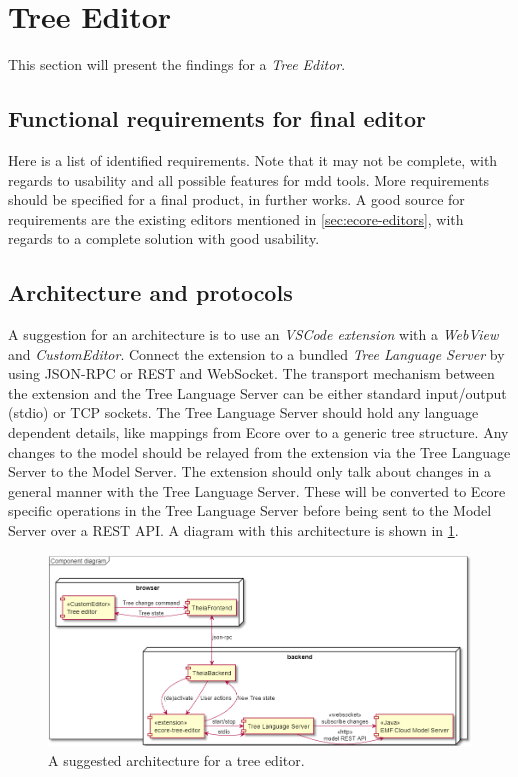 \section{Tree Editor}\label{sec:result-tree-editor}

This section will present the findings for a \emph{Tree Editor}.

\subsection{Functional requirements for final editor}

Here is a list of identified requirements.
Note that it may not be complete, with regards to usability and all possible features for \gls{mdd} tools.
More requirements should be specified for a final product, in further works.
A good source for requirements are the existing editors mentioned in \cref{sec:ecore-editors}, with regards to a complete solution with good usability.



\subsection{Architecture and protocols}

A suggestion for an architecture is to use an \emph{VSCode extension} with a \emph{WebView} and \emph{CustomEditor}.
Connect the extension to a bundled \emph{Tree Language Server} by using \gls{JSON-RPC} or \gls{REST} and \gls{WebSocket}.
The transport mechanism between the extension and the Tree Language Server can be either standard input/output (stdio) or TCP sockets.
The Tree Language Server should hold any language dependent details, like mappings from \gls{Ecore} over to a generic tree structure.
Any changes to the model should be relayed from the extension via the Tree Language Server to the Model Server.
The extension should only talk about changes in a general manner with the Tree Language Server.
These will be converted to \gls{Ecore} specific operations in the Tree Language Server before being sent to the Model Server over a \gls{REST} \acrshort{API}.
A diagram with this architecture is shown in \cref{fig:tree-editor-architecture}.

\begin{figure}[htbp]
  \centering
  \includegraphics[width=\textwidth]{figures/tree-editor-component-diagram.png}
  \caption[Tree Editor Architecture]{A suggested architecture for a tree editor.}\label{fig:tree-editor-architecture}
\end{figure}


